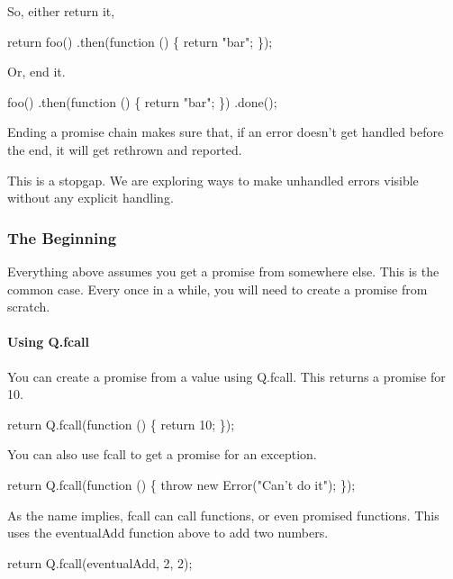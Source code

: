 So, either return it,


\begin{DoxyCode}
return foo()
.then(function () \{
    return "bar";
\});
\end{DoxyCode}


Or, end it.


\begin{DoxyCode}
foo()
.then(function () \{
    return "bar";
\})
.done();
\end{DoxyCode}


Ending a promise chain makes sure that, if an error doesn’t get handled before the end, it will get rethrown and reported.

This is a stopgap. We are exploring ways to make unhandled errors visible without any explicit handling.

\subsubsection*{The Beginning}

Everything above assumes you get a promise from somewhere else. This is the common case. Every once in a while, you will need to create a promise from scratch.

\paragraph*{Using {\ttfamily Q.\+fcall}}

You can create a promise from a value using {\ttfamily Q.\+fcall}. This returns a promise for 10.


\begin{DoxyCode}
return Q.fcall(function () \{
    return 10;
\});
\end{DoxyCode}


You can also use {\ttfamily fcall} to get a promise for an exception.


\begin{DoxyCode}
return Q.fcall(function () \{
    throw new Error("Can't do it");
\});
\end{DoxyCode}


As the name implies, {\ttfamily fcall} can call functions, or even promised functions. This uses the {\ttfamily eventual\+Add} function above to add two numbers.


\begin{DoxyCode}
return Q.fcall(eventualAdd, 2, 2);
\end{DoxyCode}


